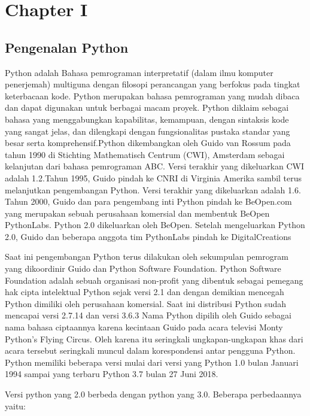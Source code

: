 \chapter{Chapter I}
\section{Pengenalan Python}
Python adalah Bahasa pemrograman interpretatif (dalam ilmu komputer penerjemah) multiguna dengan filosopi perancangan yang berfokus pada tingkat keterbacaan kode. Python merupakan bahasa pemrograman yang mudah dibaca dan dapat digunakan untuk berbagai macam proyek. Python diklaim sebagai bahasa yang menggabungkan kapabilitas, kemampuan, dengan sintaksis kode yang sangat jelas, dan dilengkapi dengan fungsionalitas pustaka standar yang besar serta komprehensif.Python dikembangkan oleh Guido van Rossum pada tahun 1990 di Stichting Mathematisch Centrum (CWI), Amsterdam sebagai kelanjutan dari bahasa pemrograman ABC. Versi terakhir yang dikeluarkan CWI adalah 1.2.Tahun 1995, Guido pindah ke CNRI di Virginia Amerika sambil terus melanjutkan pengembangan Python. Versi terakhir yang dikeluarkan adalah 1.6. Tahun 2000, Guido dan para pengembang inti Python pindah ke BeOpen.com yang merupakan sebuah perusahaan komersial dan membentuk BeOpen PythonLabs. Python 2.0 dikeluarkan oleh BeOpen. Setelah mengeluarkan Python 2.0, Guido dan beberapa anggota tim PythonLabs pindah ke DigitalCreations

Saat ini pengembangan Python terus dilakukan oleh sekumpulan pemrogram yang dikoordinir Guido dan Python Software Foundation. Python Software Foundation adalah sebuah organisasi non-profit yang dibentuk sebagai pemegang hak cipta intelektual Python sejak versi 2.1 dan dengan demikian mencegah Python dimiliki oleh perusahaan komersial. Saat ini distribusi Python sudah mencapai versi 2.7.14 dan versi 3.6.3
Nama Python dipilih oleh Guido sebagai nama bahasa ciptaannya karena kecintaan Guido pada acara televisi Monty Python's Flying Circus. Oleh karena itu seringkali ungkapan-ungkapan khas dari acara tersebut seringkali muncul dalam korespondensi antar pengguna Python. Python memiliki beberapa versi mulai dari versi yang Python 1.0 bulan Januari 1994 sampai yang terbaru Python 3.7 bulan 27 Juni 2018.

Versi python yang 2.0 berbeda dengan python yang 3.0. Beberapa perbedaannya yaitu:

